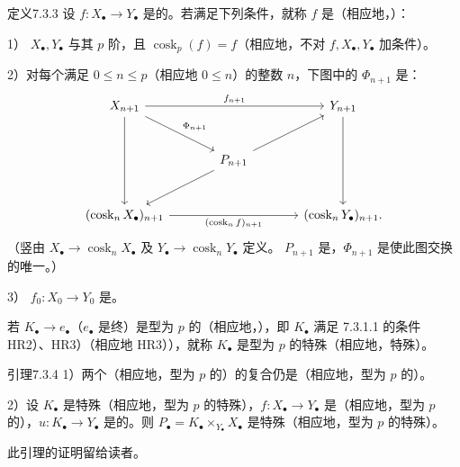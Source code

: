 \begin{SGAresult}{定义}{7.3.3}
设 $f:X_\bullet\to Y_\bullet$ 是的。若满足下列条件，就称 $f$ 是（相应地，）：

1） $X_\bullet,Y_\bullet$ 与其 $p$ 阶，且 $\operatorname{cosk}_p(f)=f$（相应地，不对 $f,X_\bullet,Y_\bullet$ 加条件）。

2）对每个满足 $0\leq n\leq p$（相应地 $0\leq n$）的整数 $n$，下图中的 $\Phi_{n+1}$ 是：
\[\begin{tikzcd}[column sep=large,row sep=large]
X_{n+1}\arrow[rr,"f_{n+1}"]\arrow[dd]\arrow[dr,"\Phi_{n+1}"]&&Y_{n+1}\arrow[dd]\\
&P_{n+1}\arrow[ur]\arrow[dl]&\\
(\operatorname{cosk}_nX_\bullet)_{n+1}\arrow[rr,"(\operatorname{cosk}_nf)_{n+1}"']&&(\operatorname{cosk}_nY_\bullet)_{n+1}.
\end{tikzcd}\]
（竖由 $X_\bullet\to\operatorname{cosk}_nX_\bullet$ 及 $Y_\bullet\to\operatorname{cosk}_nY_\bullet$ 定义。 $P_{n+1}$ 是，$\Phi_{n+1}$ 是使此图交换的唯一。）

3） $f_0:X_0\to Y_0$ 是。
\end{SGAresult}
若 $K_\bullet\to e_\bullet$（$e_\bullet$ 是终）是型为 $p$ 的（相应地，），即 $K_\bullet$ 满足 7.3.1.1 的条件 HR2）、HR3）（相应地 HR3）），就称 $K_\bullet$ 是型为 $p$ 的特殊（相应地，特殊）。
\begin{SGAresult}{引理}{7.3.4}
1）两个（相应地，型为 $p$ 的）的复合仍是（相应地，型为 $p$ 的）。

2）设 $K_\bullet$ 是特殊（相应地，型为 $p$ 的特殊），$f:X_\bullet\to Y_\bullet$ 是（相应地，型为 $p$ 的），$u:K_\bullet\to Y_\bullet$ 是的。则 $P_\bullet=K_\bullet\times_{Y_\bullet}X_\bullet$ 是特殊（相应地，型为 $p$ 的特殊）。
\end{SGAresult}
此引理的证明留给读者。

